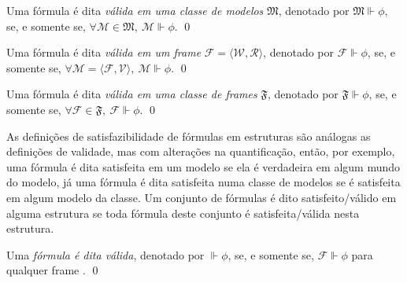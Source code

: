         \begin{definicao}
            \label{def:ValidadeClasseModelo}
            Uma fórmula \PHI é dita \textit{válida em uma classe de modelos} \(\mathfrak{M}\),
            denotado por \(\mathfrak{M} \Vdash \phi\), se, e somente se, \(\forall \mathcal{M} \in \mathfrak{M}, \ \mathcal{M} \Vdash \phi\). \qed
        \end{definicao}

        \begin{definicao}
            \label{def:ValidadeFrame}
            Uma fórmula \PHI é dita \textit{válida em um frame} \(\mathcal{F} = \langle \mathcal{W}, \mathcal{R} \rangle\),
            denotado por \(\mathcal{F} \Vdash \phi\), se, e somente se, \(\forall \mathcal{M} = \langle \mathcal{F}, \mathcal{V} \rangle,
            \ \mathcal{M} \Vdash \phi\). \qed
        \end{definicao}

        \begin{definicao}
            \label{def:ValidadeClasseFrame}
            Uma fórmula \PHI é dita \textit{válida em uma classe de frames} \(\mathfrak{F}\),
            denotado por \(\mathfrak{F} \Vdash \phi\), se, e somente se, \(\forall \mathcal{F} \in \mathfrak{F}, \ \mathcal{F} \Vdash \phi\). \qed
        \end{definicao}

        As definições de satisfazibilidade de fórmulas em estruturas são análogas as definições de validade, mas com alterações na quantificação, então, por exemplo,
        uma fórmula é dita satisfeita em um modelo se ela é verdadeira em algum mundo do modelo, já uma fórmula é dita satisfeita numa classe de modelos se é satisfeita
        em algum modelo da classe. Um conjunto de fórmulas é dito satisfeito/válido em alguma estrutura se toda fórmula deste conjunto é satisfeita/válida nesta estrutura.

        \begin{definicao}
            \label{def:FormulaValida}
            Uma \textit{fórmula \PHI é dita válida}, denotado por \(\Vdash \phi\), se, e somente se, \({\mathcal{F} \Vdash \phi}\) para qualquer frame . \qed
        \end{definicao}


